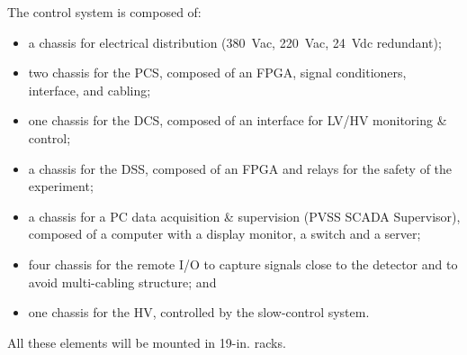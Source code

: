 The control system is composed of:
\begin{itemize}
\item a chassis for electrical distribution (380~Vac, 220~Vac, 24~Vdc redundant);
\item two chassis for the PCS, composed of an FPGA, signal conditioners, interface, and cabling;
\item one chassis for the DCS,  composed of an interface for LV/HV monitoring \& control; 
\item a chassis for the DSS, composed of an FPGA and relays for the safety of the experiment; 
\item a chassis for a PC data acquisition \& supervision (PVSS SCADA Supervisor), composed of a computer with a display monitor, a switch and a server; 
\item four chassis for the remote I/O to capture signals close to the detector and to avoid multi-cabling structure; and
\item one chassis for the HV, controlled by the slow-control system. 
\end{itemize}
All these elements will be mounted in 19-in. racks.


